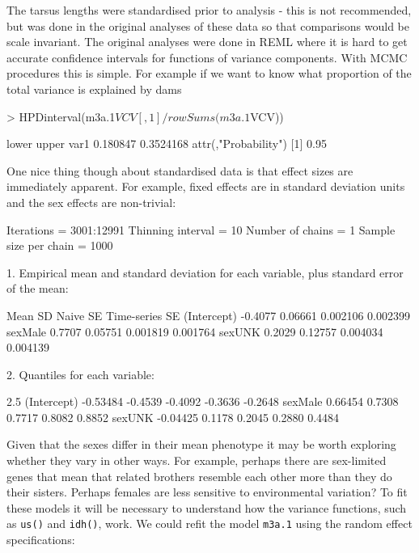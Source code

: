 \documentclass{article}
\begin{document}
The tarsus lengths were standardised prior to analysis - this is not recommended, but was done in the original analyses of these data \citep{Hadfield.2007} so that comparisons would be scale invariant. The original analyses were done in REML where it is hard to get accurate confidence intervals for functions of variance components.  With MCMC procedures this is simple. For example if we want to know what proportion of the total variance is explained by dams 

\begin{Schunk}
\begin{Sinput}
> HPDinterval(m3a.1$VCV[, 1]/rowSums(m3a.1$VCV))
\end{Sinput}
\begin{Soutput}
        lower     upper
var1 0.180847 0.3524168
attr(,"Probability")
[1] 0.95
\end{Soutput}
\end{Schunk}

One nice thing though about standardised data is that effect sizes are immediately apparent. For example, fixed effects are in standard deviation units and the sex effects are non-trivial:

\begin{Schunk}
\begin{Soutput}
Iterations = 3001:12991
Thinning interval = 10 
Number of chains = 1 
Sample size per chain = 1000 

1. Empirical mean and standard deviation for each variable,
   plus standard error of the mean:

               Mean      SD Naive SE Time-series SE
(Intercept) -0.4077 0.06661 0.002106       0.002399
sexMale      0.7707 0.05751 0.001819       0.001764
sexUNK       0.2029 0.12757 0.004034       0.004139

2. Quantiles for each variable:

                2.5%
(Intercept) -0.53484 -0.4539 -0.4092 -0.3636 -0.2648
sexMale      0.66454  0.7308  0.7717  0.8082  0.8852
sexUNK      -0.04425  0.1178  0.2045  0.2880  0.4484
\end{Soutput}
\end{Schunk}

Given that the sexes differ in their mean phenotype it may be worth exploring whether they vary in other ways. For example, perhaps there are sex-limited genes that mean that related brothers resemble each other more than they do their sisters. Perhaps females are less sensitive to environmental variation? To fit these models it will be necessary to understand how the variance functions, such as \texttt{us()} and \texttt{idh()}, work.  We could refit the model \texttt{m3a.1} using the random effect specifications:
\end{document}
